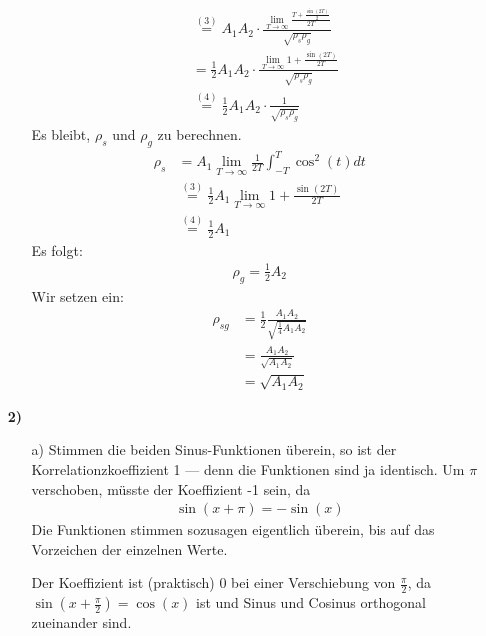 \documentclass[a4paper,11pt]{article}
\begin{document}
\begin{enumerate}
\begin{enumerate}
\begin{align*}
								  &\overset{(3)}{=} A_1A_2 \cdot \frac{\displaystyle \lim_{T \to \infty} \frac{T + \frac{\sin(2T)}{2}}{2T}}{\sqrt{\rho_s\rho_g}} \\
								  &= \frac{1}{2} A_1A_2 \cdot \frac{\displaystyle \lim_{T \to \infty} 1 + \frac{\sin(2T)}{2T}}{\sqrt{\rho_s\rho_g}} \\
								  &\overset{(4)}{=} \frac{1}{2}A_1A_2 \cdot \frac{1}{\sqrt{\rho_s\rho_g}}
					\end{align*}
					Es bleibt, $\rho_s$ und $\rho_g$ zu berechnen.
					\begin{align*}
						\rho_s &= A_1 \lim_{T \to \infty} \frac{1}{2T} \int_{-T}^T \cos^2(t) dt \\
							   &\overset{(3)}{=} \frac{1}{2} A_1 \lim_{T \to \infty} 1 + \frac{\sin(2T)}{2T} \\
							   &\overset{(4)}{=} \frac{1}{2} A_1
					\end{align*}
					Es folgt:
					\begin{align*}
						\rho_g = \frac{1}{2} A_2
					\end{align*}
					Wir setzen ein:
					\begin{align*}
						\rho_{sg} &= \frac{1}{2} \frac{A_1 A_2}{\sqrt{\frac{1}{4} A_1 A_2}} \\
								  &= \frac{A_1 A_2}{\sqrt{A_1 A_2}} \\
								  &= \sqrt{A_1 A_2}
					\end{align*}
			\end{enumerate}

		\item[\textbf{2)}]
			\begin{enumerate}
				\item[a)]
					Stimmen die beiden Sinus-Funktionen überein, so ist der
					Korrelationzkoeffizient 1 --- denn die Funktionen sind ja
					identisch. Um $\pi$ verschoben, müsste der Koeffizient -1
					sein, da
					\begin{align*}
					\sin(x + \pi) = -\sin(x)
					\end{align*}
					Die Funktionen stimmen sozusagen eigentlich überein,
					bis auf das Vorzeichen der einzelnen Werte.

					Der Koeffizient ist (praktisch) 0 bei einer Verschiebung
					von $\frac{\pi}{2}$, da $\sin(x+\frac{\pi}{2}) = \cos(x)$ ist und Sinus und Cosinus orthogonal zueinander sind.
			\end{enumerate}
	\end{enumerate}
\end{document}
